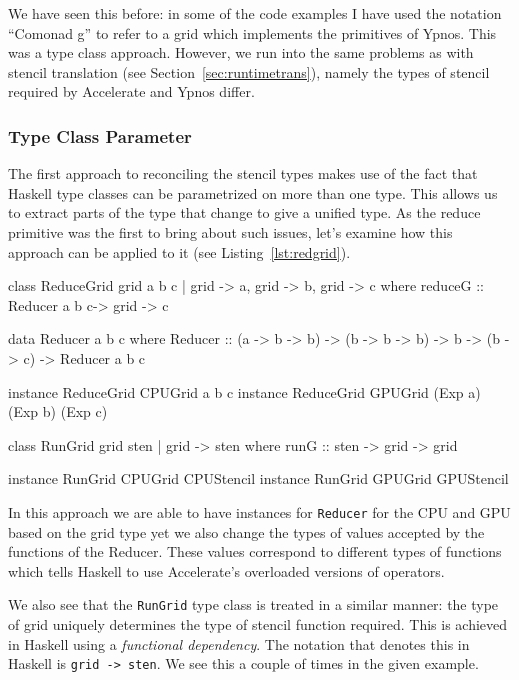 \documentclass[12pt,a4paper,oneside]{scrbook}
\begin{document}
We have seen this before: in some of the code examples I have used the notation
``Comonad g'' to refer to a grid which implements the primitives of Ypnos. This
was a type class approach. However, we run into the same problems as with
stencil translation (see Section~\ref{sec:runtimetrans}), namely the types of
stencil required by Accelerate and Ypnos differ.

\subsubsection{Type Class Parameter}

The first approach to reconciling the stencil types makes use of the fact that
Haskell type classes can be parametrized on more than one type. This allows us
to extract parts of the type that change to give a unified type. As the reduce
primitive was the first to bring about such issues, let's examine how this
approach can be applied to it (see Listing~\ref{lst:redgrid}).

\begin{hflisting}[label={lst:redgrid}, caption={The \texttt{ReduceGrid} type
  class defined with type parameters for each variable: \texttt{a}, \texttt{b}
  and \texttt{c}.}]
class ReduceGrid grid a b c | grid -> a,
                              grid -> b,
                              grid -> c where
    reduceG :: Reducer a b c-> grid -> c

data Reducer a b c where
    Reducer ::   (a -> b -> b)
              -> (b -> b -> b)
              -> b
              -> (b -> c)
              -> Reducer a b c

instance ReduceGrid CPUGrid a b c
instance ReduceGrid GPUGrid (Exp a) (Exp b) (Exp c)

class RunGrid grid sten | grid -> sten where
    runG :: sten -> grid -> grid

instance RunGrid CPUGrid CPUStencil
instance RunGrid GPUGrid GPUStencil
\end{hflisting}

In this approach we are able to have instances for \texttt{Reducer} for the CPU
and GPU based on the grid type yet we also change the types of values accepted
by the functions of the Reducer. These values correspond to different types of
functions which tells Haskell to use Accelerate's overloaded versions of
operators.

We also see that the \texttt{RunGrid} type class is treated in a similar manner:
the type of grid uniquely determines the type of stencil function required. This
is achieved in Haskell using a \emph{functional dependency}. The notation that
denotes this in Haskell is \texttt{grid -> sten}. We see this a
couple of times in the given example.
\end{document}
